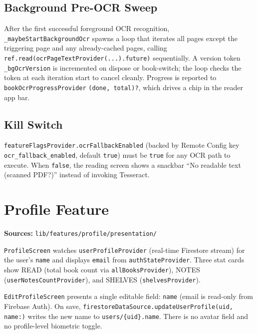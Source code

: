 \documentclass[11pt,a4paper]{article}
\begin{document}
\subsection{Background Pre-OCR Sweep}

After the first successful foreground OCR recognition, \texttt{\_maybeStartBackgroundOcr}
spawns a loop that iterates all pages except the triggering page and any already-cached
pages, calling \texttt{ref.read(ocrPageTextProvider(...).future)} sequentially. A
version token \texttt{\_bgOcrVersion} is incremented on dispose or book-switch; the
loop checks the token at each iteration start to cancel cleanly. Progress is reported
to \texttt{bookOcrProgressProvider} \texttt{({done,\,total})?}, which drives a chip in
the reader app bar.

\subsection{Kill Switch}

\texttt{featureFlagsProvider.ocrFallbackEnabled} (backed by Remote Config key
\texttt{ocr\_fallback\_enabled}, default \texttt{true}) must be \texttt{true} for any
OCR path to execute. When \texttt{false}, the reading screen shows a snackbar
``No readable text (scanned PDF?)'' instead of invoking Tesseract.

\section{Profile Feature}

\textbf{Sources:} \texttt{lib/features/profile/presentation/}

\texttt{ProfileScreen} watches \texttt{userProfileProvider} (real-time Firestore stream)
for the user's \texttt{name} and displays \texttt{email} from
\texttt{authStateProvider}. Three stat cards show READ (total book count via
\texttt{allBooksProvider}), NOTES (\texttt{userNotesCountProvider}), and SHELVES
(\texttt{shelvesProvider}).

\texttt{EditProfileScreen} presents a single editable field: \texttt{name} (email is
read-only from Firebase Auth). On save, \texttt{firestoreDataSource.updateUserProfile(uid, name:)} writes the new name to \texttt{users/\{uid\}.name}. There is no avatar field and
no profile-level biometric toggle.

\end{document}
